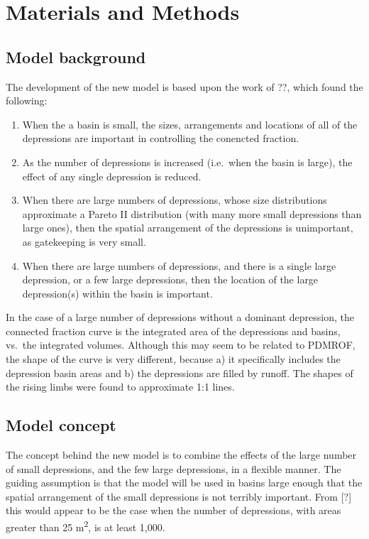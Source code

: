 \documentclass[draft,linenumbers]{agujournal2018}
\begin{document}
\section{Materials and Methods}

\subsection{Model background}

The development of the new model is based upon the work of ??, which
found the following:

\begin{enumerate}
\item
  When the a basin is small, the sizes, arrangements and locations of
  all of the depressions are important in controlling the conencted
  fraction.
\item
  As the number of depressions is increased (i.e.~when the basin is
  large), the effect of any single depression is reduced.
\item
  When there are large numbers of depressions, whose size distributions
  approximate a Pareto II distribution (with many more small depressions
  than large ones), then the spatial arrangement of the depressions is
  unimportant, as gatekeeping is very small.
\item
  When there are large numbers of depressions, and there is a single
  large depression, or a few large depressions, then the location of the
  large depression(s) within the basin is important.
\end{enumerate}

In the case of a large number of depressions without a dominant
depression, the connected fraction curve is the integrated area of the
depressions and basins, vs.~the integrated volumes. Although this may
seem to be related to PDMROF, the shape of the curve is very different,
because a) it specifically includes the depression basin areas and b)
the depressions are filled by runoff. The shapes of the rising limbs
were found to approximate 1:1 lines.

\subsection{Model concept}

The concept behind the new model is to combine the effects of the large
number of small depressions, and the few large depressions, in a
flexible manner. The guiding assumption is that the model will be used
in basins large enough that the spatial arrangement of the small
depressions is not terribly important. From {[}?{]} this would appear to
be the case when the number of depressions, with areas greater than 25
m\textsuperscript{2}, is at least 1,000.
\end{document}
